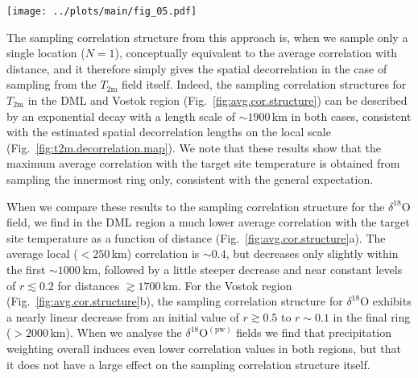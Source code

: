 \documentclass[cp, manuscript]{copernicus}
\begin{document}
\begin{figure*}[t]%
\centering
\texttt{[image: ../plots/main/fig\_05.pdf]}
\caption{%
  Sampling correlation structures with temperature for the DML and Vostok
  regions in the case of sampling single locations. Shown is the average
  correlation as a function of distance between the interannual near-surface
  temperature ($T_{2\mathrm{m}}$) at a target site and the spatial fields of
  $T_{2\mathrm{m}}$ (black), oxygen isotope composition
  ($\delta^{18}\mathrm{O}$, green) and precipitation-weighted oxygen isotope
  composition ($\delta^{18}\mathrm{O}^{\mathrm{(pw)}}$, blue). Averaging was
  performed in two steps: first, correlations were averaged across grid cells
  falling within $250$\,km wide consecutive rings around a given target site,
  and secondly, the results were averaged across all respective target sites in
  the DML \textbf{(a)} and Vostok \textbf{(b)} region (see Methods). The black
  dashed lines indicate an exponential fit to the $T_{2\mathrm{m}}$ data.}
\label{fig:avg.cor.structure}%
\end{figure*}%

The sampling correlation structure from this approach is, when we sample only a
single location ($N=1$), conceptually equivalent to the average correlation with
distance, and it therefore simply gives the spatial decorrelation in the case of
sampling from the $T_{\mathrm{2m}}$ field itself. Indeed, the sampling
correlation structures for $T_{\mathrm{2m}}$ in the DML and Vostok region
(Fig.~\ref{fig:avg.cor.structure}) can be described by an exponential decay with
a length scale of $\sim1900$\,km in both cases, consistent with the estimated
spatial decorrelation lengths on the local scale
(Fig.~\ref{fig:t2m.decorrelation.map}). We note that these results show that
the maximum average correlation with the target site temperature is obtained
from sampling the innermost ring only, consistent with the general expectation.

When we compare these results to the sampling correlation structure for the
$\delta^{18}\mathrm{O}$ field, we find in the DML region a much lower average
correlation with the target site temperature as a function of distance
(Fig.~\ref{fig:avg.cor.structure}a). The average local ($<250$\,km) correlation
is $\sim0.4$, but decreases only slightly within the first $\sim1000$\,km,
followed by a little steeper decrease and near constant levels of $r\lesssim0.2$
for distances $\gtrsim1700$\,km. For the Vostok region
(Fig.~\ref{fig:avg.cor.structure}b), the sampling correlation structure for
$\delta^{18}\mathrm{O}$ exhibits a nearly linear decrease from an initial value
of $r\gtrsim0.5$ to $r\sim0.1$ in the final ring ($>2000$\,km). When we analyse
the $\delta^{18}\mathrm{O}^{\mathrm{(pw)}}$ fields we find that precipitation
weighting overall induces even lower correlation values in both regions, but
that it does not have a large effect on the sampling correlation structure
itself.
\end{document}
